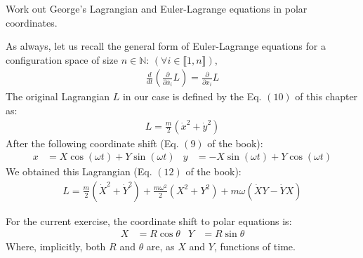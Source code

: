 \documentclass[solutions.tex]{subfiles}
\begin{document}
\maketitle
\begin{exercise}
Work out George's Lagrangian and Euler-Lagrange equations
in polar coordinates.
\end{exercise}
As always, let us recall the general form of Euler-Lagrange equations
for a configuration space of size $n\in\mathbb{N}$:
$(\forall i \in\llbracket 1, n\rrbracket)$,
\begin{align}
	\frac{d}{dt}\left(\frac{\partial}{\partial\dot{x_i}}L\right)
		= \frac{\partial}{\partial x_i}L
	\label{eqn:l06e04:euler-lagrange}
\end{align}
The original Lagrangian $L$ in our case is defined by the Eq. $(10)$
of this chapter as:
\begin{align}
	L = \frac{m}{2}\left(\dot{x}^2+\dot{y}^2\right)
	\label{eqn:l06e04:lagrangian}
\end{align}
After the following coordinate shift (Eq. $(9)$ of the book):
\begin{align}
	x &= X\cos(\omega t) + Y\sin(\omega t)& y &= -X \sin(\omega t)+Y\cos(\omega t)
	\label{eqn:l06e04-1st-shift}
\end{align}
We obtained this Lagrangian (Eq. $(12)$ of the book):
\begin{align}
	L = \frac{m}{2}(\dot{X}^2+\dot{Y}^2)
	  + \frac{m\omega^2}{2}(X^2+Y^2)
	  + m\omega(\dot{X}Y-\dot{Y}X)
	\label{eqn:l06e04:lagrangian-1st-shift}
\end{align}

For the current exercise, the coordinate shift to polar equations is:
\begin{align}
	X &= R \cos\theta & Y &= R \sin\theta
	\label{eqn:l06e04:coordinate-shift}
\end{align}
Where, implicitly, both $R$ and $\theta$ are, as $X$ and $Y$, functions of
time. \\
\end{document}
